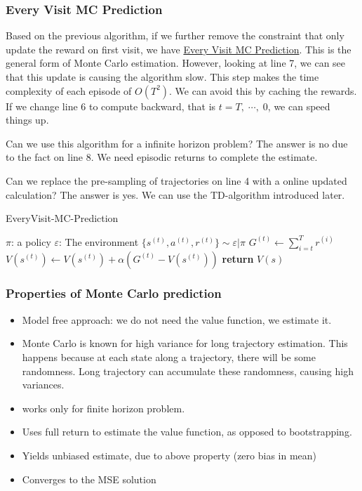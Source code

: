 \documentclass[11pt]{article}
\begin{document}
\subsubsection{Every Visit MC Prediction}
Based on the previous algorithm, if we further remove the constraint that only update the reward on first visit, we have \hyperref[alg:evmp]{Every Visit MC Prediction}. This is the general form of Monte Carlo estimation. However, looking at line 7, we can see that this update is causing the algorithm slow. This step makes the time complexity of each episode of \(O(T^2)\). We can avoid this by caching the rewards. If we change line 6 to compute backward, that is \(t=T,\;\cdots,\;0\), we can speed things up. \par
Can we use this algorithm for a infinite horizon problem? The answer is no due to the fact on line 8. We need episodic returns to complete the estimate. \par
Can we replace the pre-sampling of trajectories on line 4 with a online updated calculation? The answer is yes. We can use the TD-algorithm introduced later.
\begin{algorithm}
\caption{EveryVisit-MC-Prediction}
\label{alg:evmp}
\begin{algorithmic}[1]
\State $\pi$: a policy
\State $\varepsilon$: The environment
    \State $\{s^{(t)}, a^{(t)}, r^{(t)}\} \sim \varepsilon | \pi$
        \State $G^{(t)} \gets \sum_{i=t}^T r^{(i)}$
        \State $V(s^{(t)}) \gets V(s^{(t)}) + \alpha (G^{(t)} - V(s^{(t)}))$
        \EndFor
    \EndFor
    \State \textbf{return} $V(s)$
    \EndProcedure
\end{algorithmic}
\end{algorithm}

\subsubsection{Properties of Monte Carlo prediction}
\begin{itemize}
    \item Model free approach: we do not need the value function, we estimate it.
    \item Monte Carlo is known for high variance for long trajectory estimation. This happens because at each state along a trajectory, there will be some randomness. Long trajectory can accumulate these randomness, causing high variances. 
    \item works only for finite horizon problem.
    \item Uses full return to estimate the value function, as opposed to bootstrapping.
    \item Yields unbiased estimate, due to above property (zero bias in mean)
    \item Converges to the MSE solution
\end{itemize}
\end{document}
